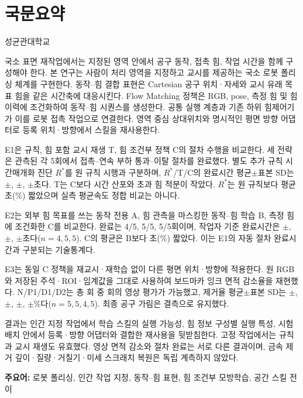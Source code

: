\chapter*{국문요약}
\begin{center}
{\fontsize{16}{21}\selectfont\bfseries\thesistitlekr\par}
\vspace{.3cm}
\thesisauthorkr\par
\thesisdepartmentkr\par
성균관대학교
\end{center}

국소 표면 재작업에서는 지정된 영역 안에서 공구 동작, 접촉 힘, 작업 시간을 함께 구성해야 한다. 본 연구는 사람이 처리 영역을 지정하고 교시를 제공하는 국소 로봇 폴리싱 체계를 구현한다. 동작--힘 결합 표현은 Cartesian 공구 위치·자세와 교시 유래 목표 힘을 같은 시간축에 대응시킨다. Flow Matching 정책은 RGB, pose, 측정 힘 및 힘 이력에 조건화하여 동작--힘 시퀀스를 생성한다. 공통 실행 계층과 기존 하위 힘제어기가 이를 로봇 접촉 작업으로 연결한다. 영역 중심 상대위치와 명시적인 평면 방향 어댑터로 등록 위치·방향에서 스킬을 재사용한다.

E1은 규칙, 힘 포함 교시 재생 T, 힘 조건부 정책 C의 절차 수행을 비교한다. 세 전략은 관측된 각 5회에서 접촉--연속 부하 통과--이탈 절차를 완료했다. 별도 추가 규칙 시간매개화 진단 \(R^{*}\)를 원 규칙 시행과 구분하며, \(R^{*}\)/T/C의 완료시간 평균\(\pm\)표본 SD는 \EoneRstarTime\(\pm\)\EoneRstarTimeSD, \EoneTTime\(\pm\)\EoneTTimeSD, \EoneCTime\(\pm\)\EoneCTimeSD{}초다. T는 C보다 시간 산포와 초과 힘 적분이 작았다. \(R^{*}\)는 원 규칙보다 평균 \RstarTimeGain{}초(\RstarTimePercent\%) 짧았으며 실측 평균속도 정합 비교는 아니다.

E2는 외부 힘 목표를 쓰는 동작 전용 A, 힘 관측을 마스킹한 동작--힘 학습 B, 측정 힘에 조건화한 C를 비교한다. 완료는 4/5, 5/5, 5/5회이며, 작업자 기준 완료시간은 \EtwoATime\(\pm\)\EtwoATimeSD, \EtwoBTime\(\pm\)\EtwoBTimeSD, \EtwoCTime\(\pm\)\EtwoCTimeSD{}초다(\(n=4,5,5\)). C의 평균은 B보다 \BCSeconds{}초(\BCPercent\%) 짧았다. 이는 E1의 자동 절차 완료시간과 구분되는 기술통계다.

E3는 동일 C 정책을 재교시·재학습 없이 다른 평면 위치·방향에 적용한다. 원 RGB와 저장된 주석·ROI·임계값을 그대로 사용하여 보드마카 잉크 면적 감소율을 재현했다. N/P1/D1/D2는 총 \EthreeMainN{}회 중 \EthreeImageN{}회의 영상 평가가 가능했고, 제거율 평균\(\pm\)표본 SD는 \EthreeNRemoval\(\pm\)\EthreeNSD, \EthreePoneRemoval\(\pm\)\EthreePoneSD, \EthreeDoneRemoval\(\pm\)\EthreeDoneSD, \EthreeDtwoRemoval\(\pm\)\EthreeDtwoSD\%다(\(n=5,5,4,5\)). 최종 공구 가림은 결측으로 유지했다.

결과는 인간 지정 작업에서 학습 스킬의 실행 가능성, 힘 정보 구성별 실행 특성, 시험 배치 안에서 등록·방향 어댑터와 결합한 재사용을 뒷받침한다. 고정 작업에서는 규칙과 교시 재생도 유효했다. 영상 면적 감소와 절차 완료는 서로 다른 결과이며, 금속 제거 깊이·질량·거칠기·미세 스크래치 복원은 독립 계측하지 않았다.

\vspace{.3cm}
\noindent\textbf{주요어:} 로봇 폴리싱, 인간 작업 지정, 동작--힘 표현, 힘 조건부 모방학습, 공간 스킬 전이
